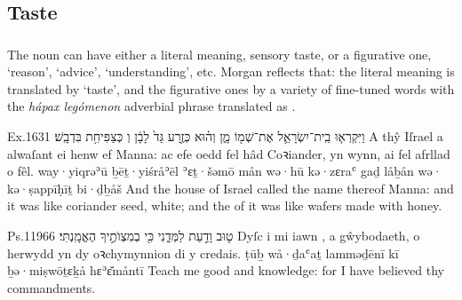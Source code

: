 \subsection{Taste}

\subsubsection{}


\begin{paper}
	The noun  can have either a literal meaning, sensory taste, or a figurative one, ‘reason’, ‘advice’, ‘understanding’, etc. Morgan reflects that: the literal meaning is translated by  ‘taste’, and the figurative ones by a variety of fine-tuned words  with the \textit{hápax legómenon} adverbial phrase  translated as .
\end{paper}

\begin{example}{Ex.}{16}{31}{}{}
	\quoling
	{וַיִּקְרְא֧וּ בֵֽית־יִשְׂרָאֵ֛ל אֶת־שְׁמ֖וֹ מָ֑ן וְה֗וּא כְּזֶ֤רַע גַּד֙ לָבָ֔ן וְ כְּצַפִּיחִ֥ת בִּדְבָֽשׁ׃}
	{A thŷ Iſrael a alwaſant ei henw ef Manna: ac efe oedd fel hâd Coꝛiander, yn wynn, ai  fel afrllad o fêl.}
	{way·yiqrəʾū ḇēṯ·yiśråʾēl ʾɛṯ·šəmō mån wə·hū kə·zɛraʿ gaḏ låḇån wə· kə·ṣappīḥīṯ bi·ḏḇåš}
	{And the house of Israel called the name thereof Manna: and it was like coriander seed, white; and the  of it was like wafers made with honey.}
\end{example}

\begin{example}{Ps.}{119}{66}{}{}
	\quoling
	{ט֤וּב  וָדַ֣עַת לַמְּדֵ֑נִי כִּ֖י בְמִצְוֺתֶ֣יךָ הֶאֱמָֽנְתִּי׃}
	{Dyſc i mi iawn , a gŵybodaeth, o herwydd yn dy oꝛchymynnion di y credais.}
	{ṭūḇ  wå·ḏaʿaṯ lamməḏēnī kī ḇə·miṣwōṯɛḵå hɛʾɛ̆måntī}
	{Teach me good  and knowledge: for I have believed thy commandments.}
\end{example}


